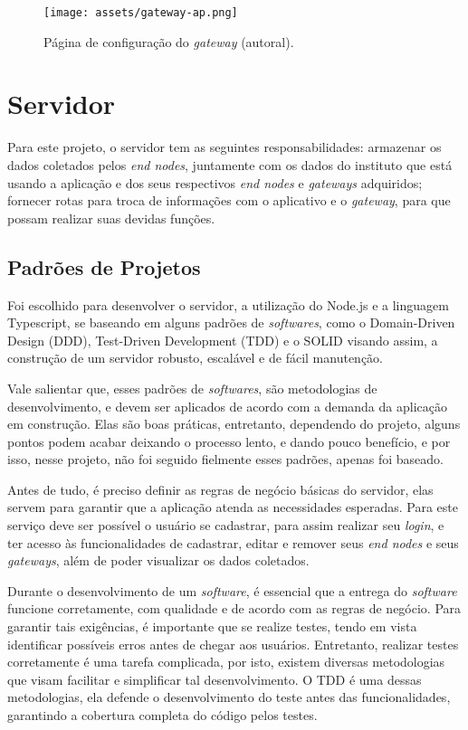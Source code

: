 \begin{figure}[H]
  \centering
  \texttt{[image: assets/gateway-ap.png]} 
  \caption{Página de configuração do \textit{gateway}  (autoral).}
  \label{fig:gateway-ap} 
\end{figure}

\section{Servidor}
\label{metod:servidor}
Para este projeto, o servidor tem as seguintes responsabilidades: armazenar os dados coletados pelos \textit{end nodes}, juntamente com os dados do instituto que está usando a aplicação e dos seus respectivos \textit{end nodes} e \textit{gateways} adquiridos; fornecer rotas para troca de informações com o aplicativo e o \textit{gateway}, para que possam realizar suas devidas funções.

\subsection{Padrões de Projetos}
\label{metod:servidor:padroes}
Foi escolhido para desenvolver o servidor, a utilização do Node.js e a linguagem Typescript, se baseando em alguns padrões de \textit{softwares}, como o Domain-Driven Design (DDD), Test-Driven Development (TDD) e o SOLID visando assim, a construção de um servidor robusto, escalável e de fácil manutenção.

Vale salientar que, esses padrões de \textit{softwares}, são metodologias de desenvolvimento, e devem ser aplicados de acordo com a demanda da aplicação em construção. Elas são boas práticas, entretanto, dependendo do projeto, alguns pontos podem acabar deixando o processo lento, e dando pouco benefício, e por isso, nesse projeto, não foi seguido fielmente esses padrões, apenas foi baseado.

Antes de tudo, é preciso definir as regras de negócio básicas do servidor, elas servem para garantir que a aplicação atenda as necessidades esperadas. Para este serviço deve ser possível o usuário se cadastrar, para assim realizar seu \textit{login}, e ter acesso às funcionalidades de cadastrar, editar e remover seus \textit{end nodes} e seus \textit{gateways}, além de poder visualizar os dados coletados.

Durante o desenvolvimento de um \textit{software}, é essencial que a entrega do \textit{software} funcione corretamente, com qualidade e de acordo com as regras de negócio. Para garantir tais exigências, é importante que se realize testes, tendo em vista identificar possíveis erros antes de chegar aos usuários. Entretanto, realizar testes corretamente é uma tarefa complicada, por isto, existem diversas metodologias que visam facilitar e simplificar tal desenvolvimento. O TDD é uma dessas metodologias, ela defende o desenvolvimento do teste antes das funcionalidades, garantindo a cobertura completa do código pelos testes.

